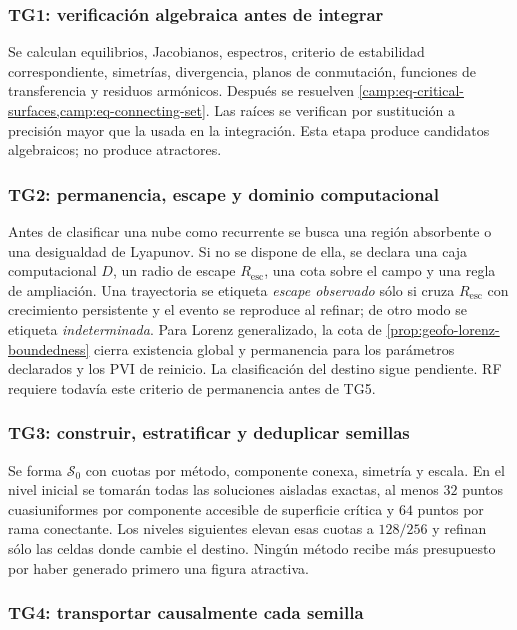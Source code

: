 \subsubsection*{TG1: verificación algebraica antes de integrar}

Se calculan equilibrios, Jacobianos, espectros, criterio de estabilidad
correspondiente, simetrías, divergencia, planos de conmutación, funciones de
transferencia y residuos armónicos. Después se resuelven
\cref{camp:eq-critical-surfaces,camp:eq-connecting-set}. Las raíces se
verifican por sustitución a precisión mayor que la usada en la integración.
Esta etapa produce candidatos algebraicos; no produce atractores.

\subsubsection*{TG2: permanencia, escape y dominio computacional}

Antes de clasificar una nube como recurrente se busca una región absorbente o
una desigualdad de Lyapunov. Si no se dispone de ella, se declara una caja
computacional \(D\), un radio de escape \(R_{\mathrm{esc}}\), una cota sobre el
campo y una regla de ampliación. Una trayectoria se etiqueta
\emph{escape observado} sólo si cruza \(R_{\mathrm{esc}}\) con crecimiento
persistente y el evento se reproduce al refinar; de otro modo se etiqueta
\emph{indeterminada}. Para Lorenz generalizado, la cota de
\cref{prop:geofo-lorenz-boundedness} cierra existencia global y permanencia
para los parámetros declarados y los PVI de reinicio. La clasificación del
destino sigue pendiente. RF requiere todavía este criterio de permanencia
antes de TG5.

\subsubsection*{TG3: construir, estratificar y deduplicar semillas}

Se forma \(\mathcal S_0\) con cuotas por método, componente conexa, simetría y
escala. En el nivel inicial se tomarán todas las soluciones aisladas exactas,
al menos \(32\) puntos cuasiuniformes por componente accesible de superficie
crítica y \(64\) puntos por rama conectante. Los niveles siguientes elevan
esas cuotas a \(128/256\) y refinan sólo las celdas donde cambie el destino.
Ningún método recibe más presupuesto por haber generado primero una figura
atractiva.

\subsubsection*{TG4: transportar causalmente cada semilla}

